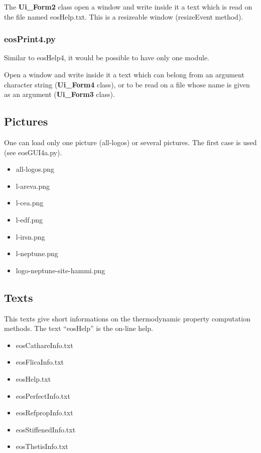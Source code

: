 \documentclass[10pt,a4paper]{article}
\begin{document}
The \textbf{Ui\_Form2} class open a window and write inside it a text which is read on the file named eosHelp.txt. This is a resizeable window (resizeEvent method).

\subsubsection{eosPrint4.py}

Similar to eosHelp4, it would be possible to have only one module. 

Open a window and write inside it a text which can belong from an argument character string (\textbf{Ui\_Form4} class), or to be read on a file whose name is given as an argument (\textbf{Ui\_Form3} class).

\subsection{Pictures}

One can load only one picture (all-logos) or several pictures. The first case is used (see eosGUI4a.py).

\begin{itemize}
\item all-logos.png
\item l-areva.png
\item l-cea.png
\item l-edf.png
\item l-irsn.png
\item l-neptune.png
\item logo-neptune-site-hammi.png
\end{itemize}

\subsection{Texts}

This texts give short informations on the thermodynamic property computation methods. The text ``eosHelp'' is the on-line help.

\begin{itemize}
\item eosCathareInfo.txt
\item eosFlicaInfo.txt
\item eosHelp.txt
\item eosPerfectInfo.txt
\item eosRefpropInfo.txt
\item eosStiffenedInfo.txt
\item eosThetisInfo.txt
\end{itemize}
\end{document}
